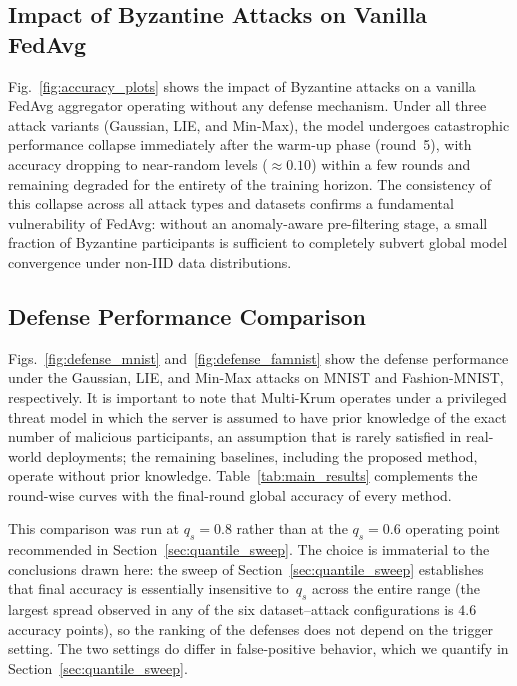 \documentclass[journal]{IEEEtran}
\begin{document}
\subsection{Impact of Byzantine Attacks on Vanilla FedAvg}

Fig.~\ref{fig:accuracy_plots} shows the impact of Byzantine attacks on a vanilla FedAvg aggregator operating without any defense mechanism. Under all three attack variants (Gaussian, LIE, and Min-Max), the model undergoes catastrophic performance collapse immediately after the warm-up phase (round~5), with accuracy dropping to near-random levels ($\approx 0.10$) within a few rounds and remaining degraded for the entirety of the training horizon. The consistency of this collapse across all attack types and datasets confirms a fundamental vulnerability of FedAvg: without an anomaly-aware pre-filtering stage, a small fraction of Byzantine participants is sufficient to completely subvert global model convergence under non-IID data distributions.

\subsection{Defense Performance Comparison}
\label{sec:defense_comparison}

Figs.~\ref{fig:defense_mnist} and~\ref{fig:defense_famnist} show the defense performance under the Gaussian, LIE, and Min-Max attacks on MNIST and Fashion-MNIST, respectively. It is important to note that Multi-Krum operates under a privileged threat model in which the server is assumed to have prior knowledge of the exact number of malicious participants, an assumption that is rarely satisfied in real-world deployments; the remaining baselines, including the proposed method, operate without prior knowledge. Table~\ref{tab:main_results} complements the round-wise curves with the final-round global accuracy of every method.

This comparison was run at $q_s = 0.8$ rather than at the $q_s = 0.6$ operating point recommended in Section~\ref{sec:quantile_sweep}. The choice is immaterial to the conclusions drawn here: the sweep of Section~\ref{sec:quantile_sweep} establishes that final accuracy is essentially insensitive to~$q_s$ across the entire range (the largest spread observed in any of the six dataset--attack configurations is $4.6$ accuracy points), so the ranking of the defenses does not depend on the trigger setting. The two settings do differ in false-positive behavior, which we quantify in Section~\ref{sec:quantile_sweep}.
\end{document}
